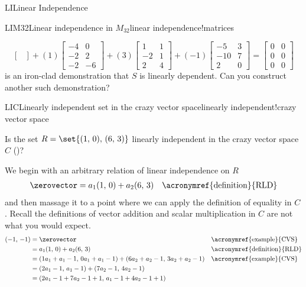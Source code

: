 \begin{subsect}{LI}{Linear Independence}
\begin{example}{LIM32}{Linear independence in $M_{32}$}{linear independence!matrices}
\begin{para}
\begin{equation*}
\begin{bmatrix}
\end{bmatrix}+
(1)\begin{bmatrix}
-4 & 0\\ -2 & 2\\ -2 & -6
\end{bmatrix}+
(3)\begin{bmatrix}
1 & 1\\ -2 & 1\\ 2 & 4
\end{bmatrix}+
(-1)\begin{bmatrix}
-5 & 3\\ -10 & 7\\ 2 & 0
\end{bmatrix}
=
\begin{bmatrix}
0&0\\0&0\\0&0
\end{bmatrix}
\end{equation*}
%
is an iron-clad demonstration that $S$ is linearly dependent.  Can you construct another such demonstration?
\end{para}
%
\end{example}
%
\begin{example}{LIC}{Linearly independent set in the crazy vector space}{linearly independent!crazy vector space}
\begin{para}Is the set $R=\set{(1,\,0),\,(6,\,3)}$ linearly independent in the crazy vector space $C$ ()?\end{para}
%
\begin{para}We begin with an arbitrary relation of linear independence on $R$
%
\begin{align*}
\zerovector &= a_1(1,\,0) + a_2(6,\,3)&&\text{\acronymref{definition}{RLD}}\\
\end{align*}
%
and then massage it to a point where we can apply the definition of equality in $C$.  Recall the definitions of vector addition and scalar multiplication in $C$ are not what you would expect.
%
\begin{align*}
(-1,\,-1)
&=\zerovector
&&\text{\acronymref{example}{CVS}}\\
%
&=a_1(1,\,0) + a_2(6,\,3)
&&\text{\acronymref{definition}{RLD}}\\
%
&=(1a_1+a_1-1,\,0a_1+a_1-1) + (6a_2+a_2-1,\,3a_2+a_2-1)
&&\text{\acronymref{example}{CVS}}\\
%
&=(2a_1-1,\,a_1-1) + (7a_2-1,\,4a_2-1)\\
%
&=(2a_1-1+7a_2-1+1,\,a_1-1+4a_2-1+1)

\end{align*}
\end{para}
\end{example}
\end{subsect}

